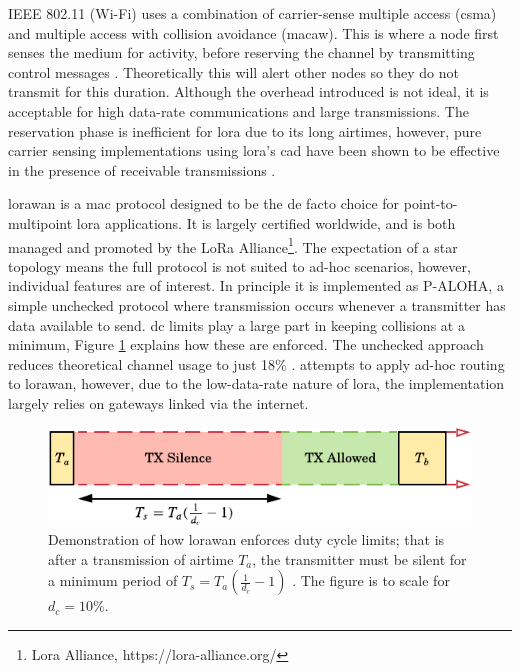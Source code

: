 IEEE 802.11 (Wi-Fi) uses a combination of carrier-sense multiple access (\ac{csma}) and multiple access with collision avoidance (\ac{macaw}). This is where a node first senses the medium for activity, before reserving the channel by transmitting control messages \cite{3YP:NETWORK_BOOK}. Theoretically this will alert other nodes so they do not transmit for this duration. Although the overhead introduced is not ideal, it is acceptable for high data-rate communications and large transmissions. The reservation phase is inefficient for \ac{lora} due to its long airtimes, however, pure carrier sensing implementations using \ac{lora}'s \ac{cad} have been shown to be effective in the presence of receivable transmissions \cite{3YP:LORA_CSMA}. 

\ac{lorawan} is a \ac{mac} protocol designed to be the de facto choice for point-to-multipoint \ac{lora} applications. It is largely certified worldwide, and is both managed and promoted by the LoRa Alliance\footnote{Lora Alliance,  https://lora-alliance.org/}. The expectation of a star topology means the full protocol is not suited to ad-hoc scenarios, however, individual features are of interest. In principle it is implemented as P-ALOHA, a simple unchecked protocol where transmission occurs whenever a transmitter has data available to send. \ac{dc} limits play a large part in keeping collisions at a minimum, Figure \ref{fig:lorawan_duty_cycles} explains how these are enforced. The unchecked approach reduces theoretical channel usage to just 18\% \cite{3YP:LORAWAN_SLOTTED}. \cite{3YP:LORAWAN_MESH} attempts to apply ad-hoc routing to \ac{lorawan}, however, due to the low-data-rate nature of \ac{lora}, the implementation largely relies on gateways linked via the internet.

\begin{figure}[H]
    \centering
   	\includegraphics{Figures/duty_cycle_lorawan}
    \caption[\ac{lorawan} duty cycle enforcement]{
    Demonstration of how \ac{lorawan} enforces duty cycle limits; that is after a transmission of airtime $T_a$, the transmitter must be silent for a minimum period of $T_s=T_a(\frac{1}{d_c}-1)$ \cite{3YP:LIMITS_OF_LORAWAN}. The figure is to scale for $d_c=10\%$.
    }
    \label{fig:lorawan_duty_cycles}
\end{figure}

